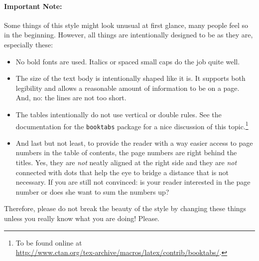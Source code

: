 \paragraph{Important Note:} Some things of this style might look
unusual at first glance, many people feel so in the beginning.
However, all things are intentionally designed to be as they are,
especially these:
\begin{itemize}
    \item No bold fonts are used. Italics or spaced small caps do the
    job quite well.
    \item The size of the text body is intentionally shaped like it
    is. It supports both legibility and allows a reasonable amount of
    information to be on a page. And, no: the lines are not too short.
    \item The tables intentionally do not use vertical or double
    rules. See the documentation for the \texttt{booktabs} package for
    a nice discussion of this topic.\footnote{To be found online at \\
    \url{http://www.ctan.org/tex-archive/macros/latex/contrib/booktabs/}.}
    \item And last but not least, to provide the reader with a way
    easier access to page numbers in the table of contents, the page
    numbers are right behind the titles. Yes, they are \emph{not}
    neatly aligned at the right side and they are \emph{not} connected
    with dots that help the eye to bridge a distance that is not
    necessary. If you are still not convinced: is your reader
    interested in the page number or does she want to sum the numbers
    up?
\end{itemize}
Therefore, please do not break the beauty of the style by changing
these things unless you really know what you are doing! Please.


